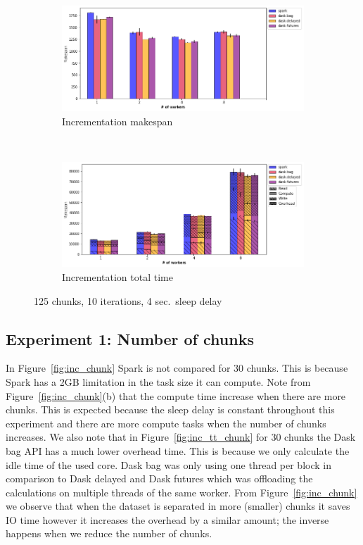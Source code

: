 \documentclass[conference]{IEEEtran}
\begin{document}
\begin{figure}[!t]
    \centering
    \begin{subfigure}[b]{\columnwidth}
        \includegraphics[clip,width=\columnwidth]{images/inc_worker.png}%
        \caption{Incrementation makespan}\label{fig:inc_ms_worker}
    \end{subfigure}
    \\
    \begin{subfigure}[b]{\columnwidth}
        \includegraphics[clip,width=\columnwidth]{images/inc_idle_worker.png}%
        \caption{Incrementation total time}\label{fig:inc_tt_worker}
    \end{subfigure}
    \caption{125 chunks, 10 iterations, 4 sec.\ sleep delay}\label{fig:inc_worker}
\end{figure}

\subsection{Experiment 1: Number of chunks}
In Figure~\ref{fig:inc_chunk} Spark is not compared for 30 chunks. This is because
Spark has a 2GB limitation in the task size it can compute. Note from
Figure~\ref{fig:inc_chunk}(b) that the compute time increase when there are more
chunks. This is expected because the sleep delay is constant throughout this
experiment and there are more compute tasks when the number of chunks increases. We
also note that in Figure~\ref{fig:inc_tt_chunk} for 30 chunks the Dask bag API has a
much lower overhead time. This is because we only calculate the idle time of the used
core. Dask bag was only using one thread per block in comparison to Dask delayed and
Dask futures which was offloading the calculations on multiple threads of the same
worker. From Figure~\ref{fig:inc_chunk} we observe that when the dataset is separated
in more (smaller) chunks it saves IO time however it increases the overhead by a
similar amount; the inverse happens when we reduce the number of chunks.
\end{document}
